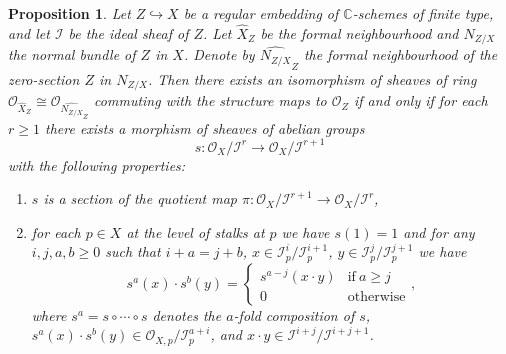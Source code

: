 \documentclass[12pt]{amsart}
\newtheorem{proposition}[theorem]{Proposition}
\theoremstyle{definition}
\theoremstyle{property}
\newcommand\I{\mathcal I}
\renewcommand\O{\mathcal O}
\newcommand\C{\mathbb C}
\renewcommand\_{^{}_}
\begin{document}
\begin{proposition} \label{formaliso}
Let $Z \hookrightarrow X$ be a regular embedding of $\C$-schemes of finite type, and let $\I$ be the ideal sheaf of $Z$. Let $\widehat{X}_Z$ be the formal neighbourhood and $N_{Z/X}$ the normal bundle of $Z$ in $X$. Denote by $\widehat{N_{Z/X}}_Z$ the formal neighbourhood of the zero-section $Z$ in $N_{Z/X}$. Then there exists an isomorphism of sheaves of ring $\O_{\widehat{X}_{Z}} \cong \O_{\widehat{N_{Z/X}}_Z}$ commuting with the structure maps to $\O_Z$ if and only if for each $r \geq 1$ there exists a morphism of sheaves of abelian groups
$$
s : \O_X / \I^r \longrightarrow \O_X / \I^{r+1}
$$
with the following properties:
\begin{enumerate}
\item $s$ is a section of the quotient map $\pi : \O_X / \I^{r+1} \longrightarrow \O_X / \I^r$,
\item for each $p \in X$ at the level of stalks at $p$ we have $s(1)=1$ and for any  $i,j,a,b \geq 0$ such that $i+a = j+b$, $x \in \I_{p}^{i} / \I_{p}^{i+1}$, $y \in \I_{p}^{j} / \I_{p}^{j+1}$ we have
$$
s^a(x) \cdot s^b(y) = \left\{ \begin{array}{cc} s^{a-j}(x \cdot y) & \mathrm{if} \ a \geq j \\ 0 & \mathrm{otherwise} \end{array} \right.,
$$ 
where $s^a = s \circ \cdots \circ s$ denotes the $a$-fold composition of $s$, $s^a(x) \cdot s^b(y) \in \O_{X,p} / \I_{p}^{a+i}$, and $x \cdot y \in \I^{i+j} / \I^{i+j+1}$.
\end{enumerate}
\end{proposition}
\end{document}
